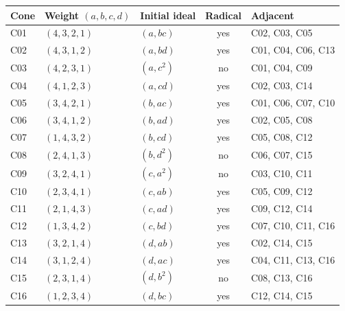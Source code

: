 \begin{longtable}{l l l c l}
\toprule
Cone & Weight $(a,b,c,d)$ & Initial ideal & Radical & Adjacent\\
\midrule
\endhead
C01 & $(4,3,2,1)$ & $(a,bc)$ & yes & C02, C03, C05\\
C02 & $(4,3,1,2)$ & $(a,bd)$ & yes & C01, C04, C06, C13\\
C03 & $(4,2,3,1)$ & $(a,c^2)$ & no & C01, C04, C09\\
C04 & $(4,1,2,3)$ & $(a,cd)$ & yes & C02, C03, C14\\
C05 & $(3,4,2,1)$ & $(b,ac)$ & yes & C01, C06, C07, C10\\
C06 & $(3,4,1,2)$ & $(b,ad)$ & yes & C02, C05, C08\\
C07 & $(1,4,3,2)$ & $(b,cd)$ & yes & C05, C08, C12\\
C08 & $(2,4,1,3)$ & $(b,d^2)$ & no & C06, C07, C15\\
C09 & $(3,2,4,1)$ & $(c,a^2)$ & no & C03, C10, C11\\
C10 & $(2,3,4,1)$ & $(c,ab)$ & yes & C05, C09, C12\\
C11 & $(2,1,4,3)$ & $(c,ad)$ & yes & C09, C12, C14\\
C12 & $(1,3,4,2)$ & $(c,bd)$ & yes & C07, C10, C11, C16\\
C13 & $(3,2,1,4)$ & $(d,ab)$ & yes & C02, C14, C15\\
C14 & $(3,1,2,4)$ & $(d,ac)$ & yes & C04, C11, C13, C16\\
C15 & $(2,3,1,4)$ & $(d,b^2)$ & no & C08, C13, C16\\
C16 & $(1,2,3,4)$ & $(d,bc)$ & yes & C12, C14, C15\\
\bottomrule
\end{longtable}
